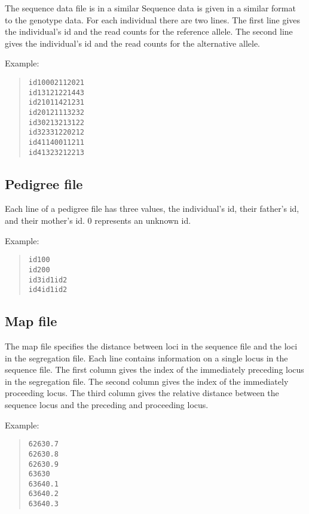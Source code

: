 \documentclass[a4paper]{article}
\begin{document}
The sequence data file is in a similar Sequence data is given in a similar format to the genotype data. For each individual there are two lines. The first line gives the individual's id and the read counts for the reference allele. The second line gives the individual's id and the read counts for the alternative allele.

Example:

\begin{quote}
\begin{alltt}
id1 0 0 0 2 1 1 2 0 2 1
id1 3 1 2 1 2 2 1 4 4 3
id2 1 0 1 1 4 2 1 2 3 1
id2 0 1 2 1 1 1 3 2 3 2
id3 0 2 1 3 2 1 3 1 2 2
id3 2 3 3 1 2 2 0 2 1 2
id4 1 1 4 0 0 1 1 2 1 1
id4 1 3 2 3 2 1 2 2 1 3
\end{alltt}
\end{quote}


\subsection{Pedigree file%
  \label{pedigree-file}%
}

Each line of a pedigree file has three values, the individual's id, their father's id, and their mother's id. \textquotedbl{}0\textquotedbl{} represents an unknown id.

Example:

\begin{quote}
\begin{alltt}
id1 0 0
id2 0 0
id3 id1 id2
id4 id1 id2
\end{alltt}
\end{quote}


\subsection{Map file%
  \label{map-file}%
}

The map file specifies the distance between loci in the sequence file and the loci in the segregation file. Each line contains information on a single locus in the sequence file. The first column gives the index of the immediately preceding locus in the segregation file. The second column gives the index of the immediately proceeding locus. The third column gives the relative distance between the sequence locus and the preceding and proceeding locus.

Example:

\begin{quote}
\begin{alltt}
62 63 0.7
62 63 0.8
62 63 0.9
63 63 0
63 64 0.1
63 64 0.2
63 64 0.3
\end{alltt}
\end{quote}
\end{document}
